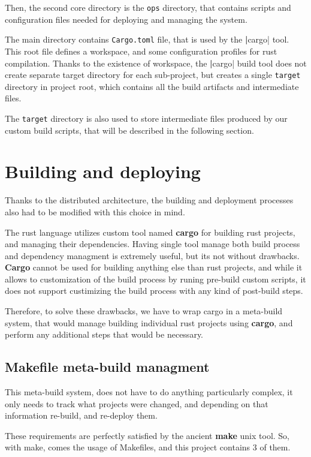 Then, the second core directory is the \verb|ops| directory, that contains scripts and configuration files
needed for deploying and managing the system.

The main directory contains \verb|Cargo.toml| file, that is used by the \textbf|cargo| tool. This root file
defines a workspace, and some configuration profiles for rust compilation. Thanks to the existence of workspace,
the \textbf|cargo| build tool does not create separate target directory for each sub-project, but creates
a single \verb|target| directory in project root, which contains all the build artifacts and intermediate files.

The \verb|target| directory is also used to store intermediate files produced by our custom build scripts, that
will be described in the following section.

\section{Building and deploying}
Thanks to the distributed architecture, the building and deployment processes also had to be modified with this choice in mind.

The rust language utilizes custom tool named \textbf{cargo} for building rust projects, and managing their dependencies.
Having single tool manage both build process and dependency managment is extremely useful, but its not without drawbacks.
\textbf{Cargo} cannot be used for building anything else than rust projects, and while it allows to customization
of the build process by runing pre-build custom scripts, it does not support custimizing the build process with
any kind of post-build steps.

Therefore, to solve these drawbacks, we have to wrap cargo in a meta-build system, that would manage building
individual rust projects using \textbf{cargo}, and perform any additional steps that would be necessary.

\subsection{Makefile meta-build managment}
This meta-build system, does not have to do anything particularly complex, it only needs to track what projects
were changed, and depending on that information re-build, and re-deploy them.

These requirements are perfectly satisfied by the ancient \textbf{make} unix tool. So, with make, comes
the usage of Makefiles, and this project contains 3 of them.

